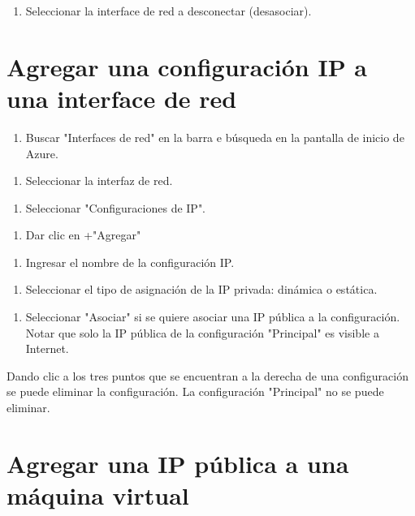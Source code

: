 \begin{enumerate}
\item Seleccionar la interface de red a desconectar (desasociar).
\end{enumerate}

\section{Agregar una configuración IP a una interface de red}

\begin{enumerate}
\item Buscar "Interfaces de red" en la barra e búsqueda en la pantalla de inicio de Azure.
\end{enumerate}

\begin{enumerate}
\item Seleccionar la interfaz de red.
\end{enumerate}

\begin{enumerate}
\item Seleccionar "Configuraciones de IP".
\end{enumerate}

\begin{enumerate}
\item Dar clic en +"Agregar"
\end{enumerate}

\begin{enumerate}
\item Ingresar el nombre de la configuración IP.
\end{enumerate}

\begin{enumerate}
\item Seleccionar el tipo de asignación de la IP privada: dinámica o estática.
\end{enumerate}

\begin{enumerate}
\item Seleccionar "Asociar" si se quiere asociar una IP pública a la configuración. Notar que solo la IP pública de la configuración "Principal" es visible a Internet.
\end{enumerate}

Dando clic a los tres puntos que se encuentran a la derecha de una configuración se puede eliminar la configuración. La configuración "Principal" no se puede eliminar.

\section{Agregar una IP pública a una máquina virtual}

